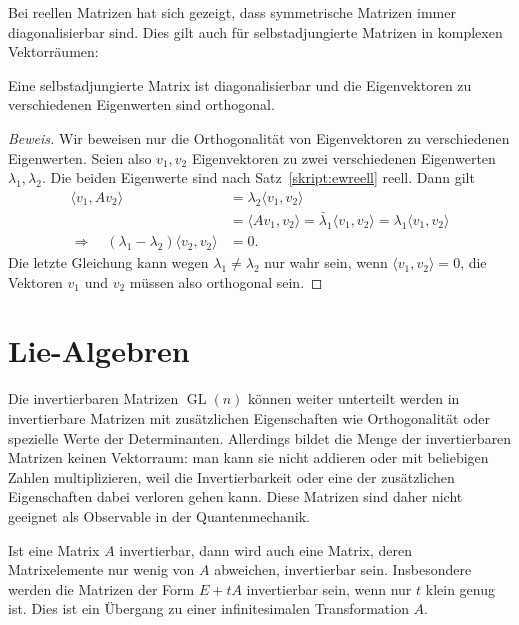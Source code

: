 Bei reellen Matrizen hat sich gezeigt, dass symmetrische Matrizen immer
diagonalisierbar sind. Dies gilt auch für selbstadjungierte Matrizen
in komplexen Vektorräumen:

\begin{satz}
\label{skript:evorthogonal}
Eine selbstadjungierte Matrix ist diagonalisierbar und die Eigenvektoren zu
verschiedenen Eigenwerten sind orthogonal.
\end{satz}

\begin{proof}[Beweis]
Wir beweisen nur die Orthogonalität von Eigenvektoren zu verschiedenen 
Eigenwerten. Seien also $v_1,v_2$ Eigenvektoren zu zwei verschiedenen
Eigenwerten $\lambda_1,\lambda_2$. Die beiden Eigenwerte sind nach
Satz~\ref{skript:ewreell} reell. Dann gilt
\begin{align*}
\langle v_1,Av_2\rangle&=\lambda_2\langle v_1,v_2\rangle
\\
       &=\langle Av_1,v_2\rangle
	=\bar\lambda_1\langle v_1,v_2\rangle
	=\lambda_1\langle v_1,v_2\rangle
\\
\Rightarrow\quad
(\lambda_1-\lambda_2)\langle v_2,v_2\rangle&=0.
\end{align*}
Die letzte Gleichung kann wegen $\lambda_1\ne\lambda_2$ nur wahr sein,
wenn $\langle v_1,v_2\rangle =0$, die Vektoren $v_1$ und $v_2$ müssen
also orthogonal sein.
\end{proof}

%
%
\section{Lie-Algebren}
Die invertierbaren Matrizen $\operatorname{GL}(n)$ können weiter
unterteilt werden in invertierbare Matrizen mit zusätzlichen
Eigenschaften wie Orthogonalität oder spezielle Werte der Determinanten.
Allerdings bildet die Menge der invertierbaren Matrizen keinen
Vektorraum: man kann sie nicht addieren oder mit beliebigen Zahlen
multiplizieren, weil die Invertierbarkeit oder eine der zusätzlichen
Eigenschaften dabei verloren gehen kann. Diese Matrizen sind 
daher nicht geeignet als Observable in der Quantenmechanik.

Ist eine Matrix $A$ invertierbar, dann wird auch eine Matrix, deren
Matrixelemente nur wenig von $A$ abweichen, invertierbar sein.
Insbesondere werden die Matrizen der Form $E+tA$ invertierbar sein,
wenn nur $t$ klein genug ist. Dies ist ein Übergang zu einer 
infinitesimalen Transformation $A$.

